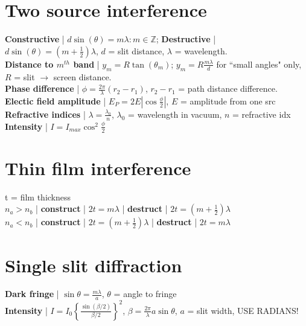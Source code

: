 \documentclass{article}
\begin{document}
\section{Two source interference}
\vspace{-3mm}
\textbf{Constructive} | $d\sin{(\theta)} = m\lambda : m \in \mathbb{Z}$; \textbf{Destructive} | $d\sin{(\theta)} = (m + \frac{1}{2})\lambda$, $d$ = slit distance, $\lambda$ = wavelength. \\
\textbf{Distance to $m^{th}$ band} | $y_m = R\tan{(\theta_m)}$; $y_m = R\frac{m\lambda}{d}$ for ``small angles" only, $R$ = slit $\rightarrow$ screen distance. \\
\textbf{Phase difference} | $\phi = \frac{2\pi}{\lambda}(r_2 - r_1)$, $r_2 -r_1$ = path distance difference. \\
\textbf{Electic field amplitude} | $E_P = 2E\left|\cos{\frac{\phi}{2}}\right|$, $E$ = amplitude from one src \\
\textbf{Refractive indices} | $\lambda = \frac{\lambda_0}{n}$, $\lambda_0$ = wavelength in vacuum, $n$ = refractive idx \\
\vspace{-1mm}
\textbf{Intensity} | $I = I_{max}\cos^2{\frac{\phi}{2}}$
\vspace{-5mm}
\section{Thin film interference}
t = film thickness \\
\textbf{$n_a > n_b$} | \textbf{construct} | $2t = m\lambda$ | \textbf{destruct} | $2t = (m + \frac{1}{2})\lambda$ \\
\textbf{$n_a < n_b$} | \textbf{construct} | $2t = (m + \frac{1}{2})\lambda$ | \textbf{destruct} | $2t = m\lambda$
\vspace{-5mm}
\section{Single slit diffraction}
\vspace{-3mm}
\textbf{Dark fringe} | $\sin\theta = \frac{m\lambda}{a}$, $\theta$ = angle to fringe \\
\textbf{Intensity} | $I = I_0\left\{\frac{\sin{(\beta/2)}}{\beta/2}\right\}^2$, $\beta = \frac{2\pi}{\lambda}a\sin{\theta}$, $a$ = slit width, USE RADIANS!
\vspace{-5mm}
\end{document}
